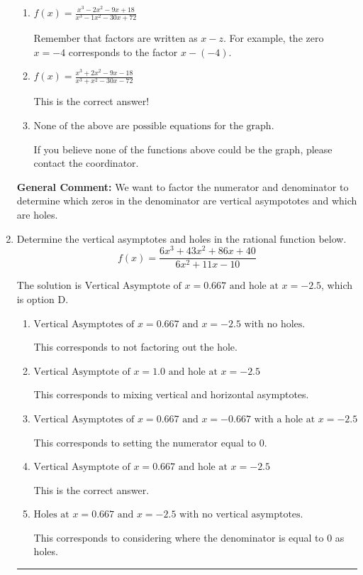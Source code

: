 \documentclass{extbook}[14pt]
\newcommand{\litem}[1]{\item #1

\rule{\textwidth}{0.4pt}}
\begin{document}
\begin{enumerate}
{\begin{enumerate}[label=\Alph*.]
You treated all of the zeros in the denominator as vertical asymptotes when some of them were holes!
\item \( f(x)=\frac{x^{3} -2 x^{2} -9 x + 18}{x^{3} -1 x^{2} -30 x + 72} \)

Remember that factors are written as $x-z$. For example, the zero $x=-4$ corresponds to the factor $x-(-4)$.
\item \( f(x)=\frac{x^{3} +2 x^{2} -9 x -18}{x^{3} + x^{2} -30 x -72} \)

This is the correct answer!
\item \( \text{None of the above are possible equations for the graph.} \)

If you believe none of the functions above could be the graph, please contact the coordinator.
\end{enumerate}

\textbf{General Comment:} We want to factor the numerator and denominator to determine which zeros in the denominator are vertical asympototes and which are holes.
}
\litem{
Determine the vertical asymptotes and holes in the rational function below.
\[ f(x) = \frac{6x^{3} +43 x^{2} +86 x + 40}{6x^{2} +11 x -10} \]

The solution is \( \text{Vertical Asymptote of } x = 0.667 \text{ and hole at } x = -2.5 \), which is option D.\begin{enumerate}[label=\Alph*.]
\item \( \text{Vertical Asymptotes of } x = 0.667 \text{ and } x = -2.5 \text{ with no holes.} \)

This corresponds to not factoring out the hole.
\item \( \text{Vertical Asymptote of } x = 1.0 \text{ and hole at } x = -2.5 \)

This corresponds to mixing vertical and horizontal asymptotes.
\item \( \text{Vertical Asymptotes of } x = 0.667 \text{ and } x = -0.667 \text{ with a hole at } x = -2.5 \)

This corresponds to setting the numerator equal to 0.
\item \( \text{Vertical Asymptote of } x = 0.667 \text{ and hole at } x = -2.5 \)

This is the correct answer.
\item \( \text{Holes at } x = 0.667 \text{ and } x = -2.5 \text{ with no vertical asymptotes.} \)

This corresponds to considering where the denominator is equal to 0 as holes.
\end{enumerate}

}
\end{enumerate}
\end{document}
